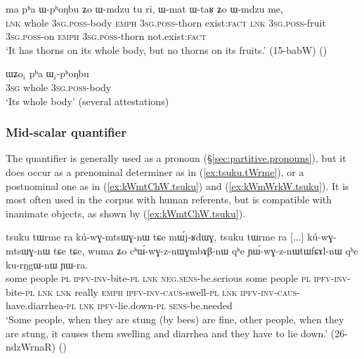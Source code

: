  \begin{exe}
\ex \label{ex:pha.WphoNbu}
\gll ma pʰa ɯ-pʰoŋbu ʑo ɯ-mdzu tu ri, ɯ-mat ɯ-taʁ ʑo ɯ-mdzu me,  \\
\textsc{lnk} whole \textsc{3sg}.\textsc{poss}-body \textsc{emph} \textsc{3sg}.\textsc{poss}-thorn exist:\textsc{fact} \textsc{lnk} \textsc{3sg}.\textsc{poss}-fruit  \textsc{3sg}.\textsc{poss}-on \textsc{emph}   \textsc{3sg}.\textsc{poss}-thorn not.exist:\textsc{fact} \\
\glt `It has thorns on its whole body, but no thorns on its fruits.' (15-babW)
()
  \end{exe}
  
 \begin{exe}
\ex \label{ex:WZo.pha.WphoNbu}
\gll  ɯʑo$_i$  pʰa ɯ$_i$-pʰoŋbu  \\
\textsc{3sg} whole \textsc{3sg}.\textsc{poss}-body \\
\glt `Its whole body' (several attestations)
\end{exe}
  
\subsubsection{Mid-scalar quantifier} \label{sec:tsuku}
The quantifier  is generally used as a pronoun (§\ref{sec:partitive.pronouns}), but it does occur as a prenominal determiner as in (\ref{ex:tsuku.tWrme}), or a postnominal one as in (\ref{ex:kWmtChW.tsuku}) and (\ref{ex:kWmWrkW.tsuku}). It is most often used in the corpus with human referents, but is compatible with inanimate objects, as shown by (\ref{ex:kWmtChW.tsuku}).

\begin{exe}
\ex \label{ex:tsuku.tWrme}
\gll tsuku tɯrme ra kú-wɣ-mtsɯɣ-nɯ tɕe mɯ́j-ʁdɯɣ, tsuku tɯrme ra [...] kú-wɣ-mtsɯɣ-nɯ tɕe tɕe, wuma ʑo cʰɯ́-wɣ-z-nɯɣmbɤβ-nɯ qʰe ɲɯ́-wɣ-z-nɯtɯfɕɤl-nɯ qʰe ku-rŋgɯ-nɯ ɲɯ-ra.\\
some people \textsc{pl} \textsc{ipfv}-\textsc{inv}-bite-\textsc{pl} \textsc{lnk} \textsc{neg}.\textsc{sens}-be.serious some people \textsc{pl} { } \textsc{ipfv}-\textsc{inv}-bite-\textsc{pl} \textsc{lnk} \textsc{lnk} really \textsc{emph} \textsc{ipfv}-\textsc{inv}-\textsc{caus}-swell-\textsc{pl} \textsc{lnk}  \textsc{ipfv}-\textsc{inv}-\textsc{caus}-have.diarrhea-\textsc{pl} \textsc{lnk} \textsc{ipfv}-lie.down-\textsc{pl} \textsc{sens}-be.needed\\
\glt `Some people, when they are stung (by bees) are fine, other people, when they are stung, it causes them swelling and diarrhea and they have to lie down.' (26-ndzWrnaR)
()
\end{exe}

